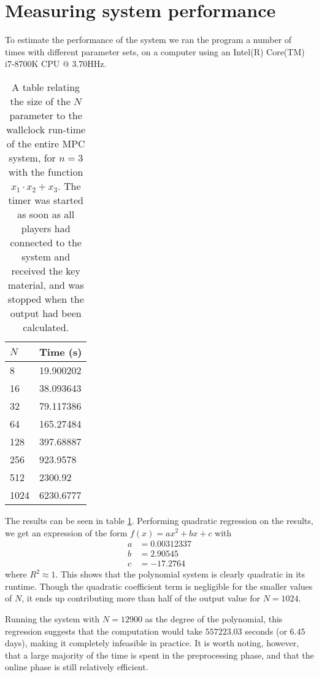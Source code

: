 \documentclass[../main.tex]{subfiles}
\begin{document}
\section{Measuring system performance}
To estimate the performance of the system we ran the program a number of times with different parameter sets, on a computer using an Intel(R) Core(TM) i7-8700K CPU @ 3.70HHz.

\begin{table}
    \centering
    \begin{tabular}{l|l}
        $N$  & Time (s)  \\
        \hline
        8    & 19.900202 \\
        16   & 38.093643 \\
        32   & 79.117386 \\
        64   & 165.27484 \\
        128  & 397.68887 \\
        256  & 923.9578  \\
        512  & 2300.92   \\
        1024 & 6230.6777
    \end{tabular}
    \caption{A table relating the size of the $N$ parameter to the wallclock run-time of the entire MPC system, for $n = 3$ with the function $x_1 \cdot x_2 + x_3$. The timer was started as soon as all players had connected to the system and received the key material, and was stopped when the output had been calculated.}
    \label{tab:synthetic-division-performance}
\end{table}

The results can be seen in table \ref{tab:synthetic-division-performance}. Performing quadratic regression on the results, we get an expression of the form $f(x) = a x^2 + b x + c$ with
\begin{align*}
    a & = 0.00312337 \\
    b & = 2.90545    \\
    c & = -17.2764
\end{align*}
where $R^2 \approx 1$. This shows that the polynomial system is clearly quadratic in its runtime. Though the quadratic coefficient term is negligible for the smaller values of $N$, it ends up contributing more than half of the output value for $N = 1024$.

Running the system with $N = 12900$ as the degree of the polynomial, this regression suggests that the computation would take $557223.03$ seconds (or $6.45$ days), making it completely infeasible in practice.
It is worth noting, however, that a large majority of the time is spent in the preprocessing phase, and that the online phase is still relatively efficient.
\end{document}
